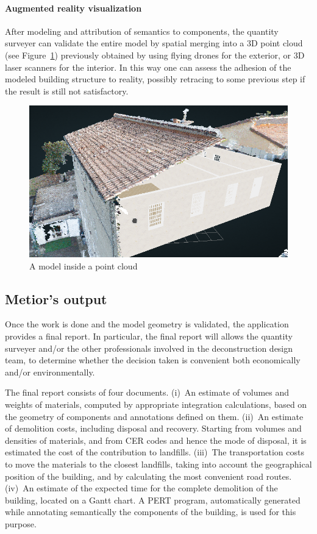 \paragraph{Augmented reality visualization} 

After modeling and attribution of semantics to components, the quantity surveyer can validate the entire model by spatial merging into a 3D point cloud (see Figure~\ref{fig:augmented}) previously obtained by using flying drones for the exterior, or 3D laser scanners for the interior. In this way one can assess the adhesion of the modeled building structure to reality, possibly retracing to some previous step if the result is still not satisfactory.

\begin{figure}[htbp] %
   \centering
   \includegraphics[width=1\linewidth]{images/augmented}
   \caption{A model inside a point cloud}
   \label{fig:augmented}
\end{figure}

\subsection{Metior's output}

\noindent 
Once the work is done and the model geometry is validated, the application provides a final report.
In particular, the final report will allows the quantity surveyer and/or the other professionals involved in the deconstruction design team, to determine whether the decision taken is convenient both economically and/or environmentally.

The final report consists of four documents.
(i)~An estimate of volumes and weights of materials, computed by appropriate integration calculations, based on the geometry of components and annotations defined on them.
(ii)~An estimate of demolition costs, including disposal and recovery.
Starting from volumes and densities of materials, and from CER codes and hence the mode of disposal, it is estimated the cost of the contribution to landfills.
(iii)~The transportation costs to move the materials to the closest landfills, taking into account the geographical position of the building, and by calculating the most convenient road routes.
(iv)~An estimate of the expected time for the complete demolition of the building, located on a Gantt chart. A PERT program, automatically generated while annotating semantically the components of the building, is used for this purpose.

\noindent